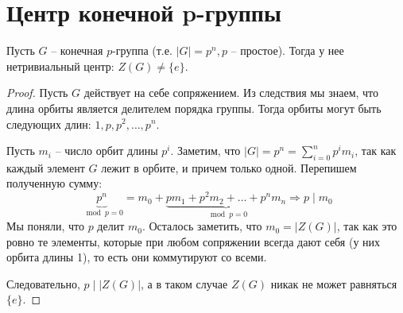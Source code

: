 \section{Центр конечной p-группы}
\begin{theorem-non}
    Пусть $G$ -- конечная $p$-группа (т.е. $|G| = p^n, p$ -- простое).
    Тогда у нее нетривиальный центр: $Z(G) \neq \{ e \}$.
\end{theorem-non}
\begin{proof}
    Пусть $G$ действует на себе сопряжением. 
    Из следствия мы знаем, что длина орбиты является делителем порядка группы. 
    Тогда орбиты могут быть следующих длин: $1, p, p^2, \dots, p^n$. 

    Пусть $m_i$ -- число орбит длины $p^i$. 
    Заметим, что $|G| = p^n = \sum\limits_{i = 0}^n p^im_i$, так как каждый элемент $G$ лежит в орбите, и причем только одной.
    Перепишем полученную сумму: \[ \underbrace{p^n}_{\mod p = 0} = m_0 + \underbrace{pm_1 + p^2m_2 + \dots + p^nm_n}_{\mod p = 0} \Rightarrow p \mid m_0 \]
    Мы поняли, что $p$ делит $m_0$. 
    Осталось заметить, что $m_0 = |Z(G)|$, так как это ровно те элементы, которые при любом сопряжении всегда дают себя (у них орбита длины 1), то есть они коммутируют со всеми.

    Следовательно, $p \mid |Z(G)|$, а в таком случае $Z(G)$ никак не может равняться $\{ e \}$.
\end{proof}
